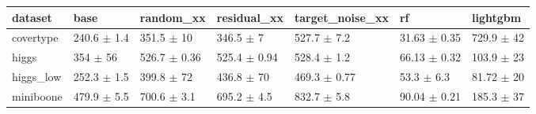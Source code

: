 \begin{tabular}{lllllll}
\toprule
dataset & base & random\_xx & residual\_xx & target\_noise\_xx & rf & lightgbm \\
\midrule
covertype & 240.6 $\pm$ 1.4 & 351.5 $\pm$ 10 & 346.5 $\pm$ 7 & 527.7 $\pm$ 7.2 & 31.63 $\pm$ 0.35 & 729.9 $\pm$ 42 \\
higgs & 354 $\pm$ 56 & 526.7 $\pm$ 0.36 & 525.4 $\pm$ 0.94 & 528.4 $\pm$ 1.2 & 66.13 $\pm$ 0.32 & 103.9 $\pm$ 23 \\
higgs\_low & 252.3 $\pm$ 1.5 & 399.8 $\pm$ 72 & 436.8 $\pm$ 70 & 469.3 $\pm$ 0.77 & 53.3 $\pm$ 6.3 & 81.72 $\pm$ 20 \\
miniboone & 479.9 $\pm$ 5.5 & 700.6 $\pm$ 3.1 & 695.2 $\pm$ 4.5 & 832.7 $\pm$ 5.8 & 90.04 $\pm$ 0.21 & 185.3 $\pm$ 37 \\
\bottomrule
\end{tabular}
